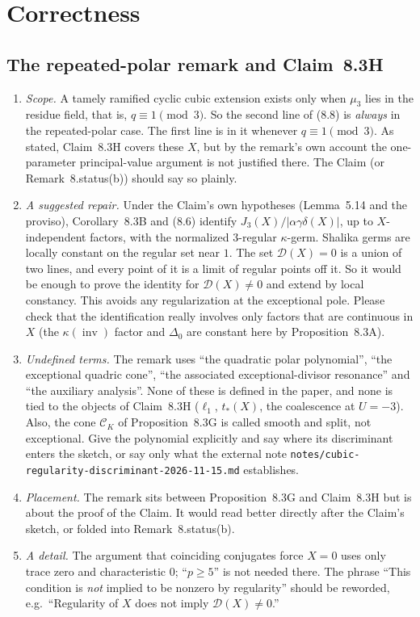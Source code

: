 \documentclass[12pt,letterpaper]{amsart}
\DeclareMathOperator{\inv}{inv}
\begin{document}
\section{Correctness}

\subsection{The repeated-polar remark and Claim~8.3H}\label{sec:polar}

\begin{enumerate}
\item \emph{Scope.} A tamely ramified cyclic cubic extension exists only when
$\mu_3$ lies in the residue field, that is, $q\equiv1\pmod3$. So the second
line of (8.8) is \emph{always} in the repeated-polar case. The first
line is in it whenever $q\equiv1\pmod 3$. As stated, Claim~8.3H covers these
$X$, but by the remark's own account the one-parameter principal-value
argument is not justified there. The Claim (or Remark~8.status(b)) should say
so plainly.
\item \emph{A suggested repair.} Under the Claim's own hypotheses (Lemma~5.14
and the proviso), Corollary~8.3B and (8.6) identify
$J_3(X)/|\alpha\gamma\delta(X)|$, up to $X$-independent factors, with the
normalized $3$-regular $\kappa$-germ. Shalika germs are locally constant on
the regular set near $1$. The set $\mathscr D(X)=0$ is a union of two lines,
and every point of it is a limit of regular points off it. So it would be
enough to prove the identity for $\mathscr D(X)\neq0$ and extend by local
constancy. This avoids any regularization at the exceptional pole. Please
check that the identification really involves only factors that are
continuous in $X$ (the $\kappa(\inv)$ factor and $\Delta_0$ are constant here
by Proposition~8.3A).
\item \emph{Undefined terms.} The remark uses ``the quadratic polar
polynomial'', ``the exceptional quadric cone'', ``the associated
exceptional-divisor resonance'' and ``the auxiliary analysis''. None of these
is defined in the paper, and none is tied to the objects of Claim~8.3H
($\ell_1$, $t_*(X)$, the coalescence at $U=-3$). Also, the cone
$\mathcal C_K$ of Proposition~8.3G is called smooth and split, not
exceptional. Give the polynomial explicitly and say where its discriminant
enters the sketch, or say only what the external note
\texttt{notes/cubic-regularity-discriminant-2026-11-15.md} establishes.
\item \emph{Placement.} The remark sits between Proposition~8.3G and
Claim~8.3H but is about the proof of the Claim. It would read better directly
after the Claim's sketch, or folded into Remark~8.status(b).
\item \emph{A detail.} The argument that coinciding conjugates force $X=0$
uses only trace zero and characteristic $0$; ``$p\geq5$'' is not needed there.
The phrase ``This condition is \emph{not} implied to be nonzero by regularity''
should be reworded, e.g.\ ``Regularity of $X$ does not imply
$\mathscr D(X)\neq0$.''
\end{enumerate}
\end{document}
